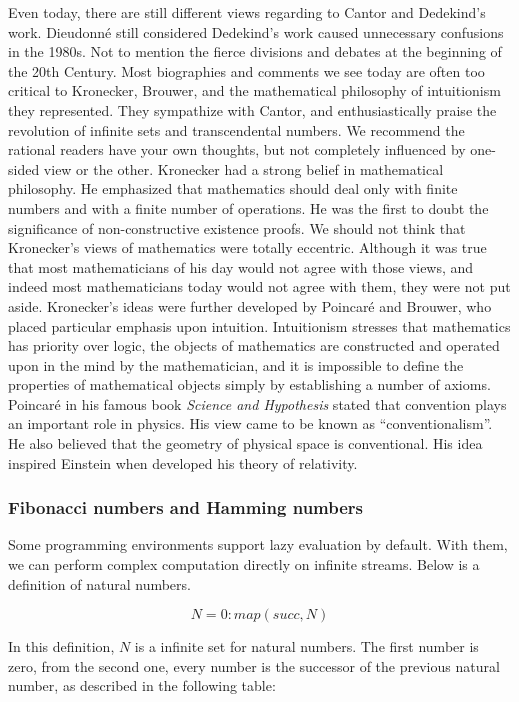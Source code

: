 \documentclass{article}
\begin{document}
Even today, there are still different views regarding to Cantor and Dedekind's work. Dieudonné still considered Dedekind's work caused unnecessary confusions in the 1980s. Not to mention the fierce divisions and debates at the beginning of the 20th Century. Most biographies and comments we see today are often too critical to Kronecker, Brouwer, and the mathematical philosophy of intuitionism they represented. They sympathize with Cantor, and enthusiastically praise the revolution of infinite sets and transcendental numbers. We recommend the rational readers have your own thoughts, but not completely influenced by one-sided view or the other. Kronecker had a strong belief in mathematical philosophy. He emphasized that mathematics should deal only with finite numbers and with a finite number of operations. He was the first to doubt the significance of non-constructive existence proofs. We should not think that Kronecker's views of mathematics were totally eccentric. Although it was true that most mathematicians of his day would not agree with those views, and indeed most mathematicians today would not agree with them, they were not put aside. Kronecker's ideas were further developed by Poincaré and Brouwer, who placed particular emphasis upon intuition. Intuitionism stresses that mathematics has priority over logic, the objects of mathematics are constructed and operated upon in the mind by the mathematician, and it is impossible to define the properties of mathematical objects simply by establishing a number of axioms. Poincaré in his famous book {\em  Science and Hypothesis} stated that convention plays an important role in physics. His view came to be known as ``conventionalism''. He also believed that the geometry of physical space is conventional. His idea inspired Einstein when developed his theory of relativity.

\subsubsection{Fibonacci numbers and Hamming numbers}

Some programming environments support lazy evaluation by default. With them, we can perform complex computation directly on infinite streams. Below is a definition of natural numbers.

\[
N = 0 : map(succ, N)
\]

In this definition, $N$ is a infinite set for natural numbers. The first number is zero, from the second one, every number is the successor of the previous natural number, as described in the following table:
\end{document}
